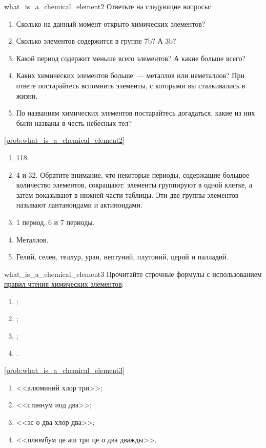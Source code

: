 \begin{problem}{}{what_is_a_chemical_element2}
    Ответьте на следующие вопросы:
    \begin{enumerate}[label=\arabic*)]
        \item Сколько на данный момент открыто химических элементов?
        \item Сколько элементов содержится в группе 7b? А 3b?
        \item Какой период содержит меньше всего элементов? А какие больше всего?
        \item Каких химических элементов больше~--- металлов или неметаллов? При ответе постарайтесь вспомнить элементы, с которыми вы сталкивались в жизни.
        \item По названиям химических элементов постарайтесь догадаться, какие из них были названы в честь небесных тел?
    \end{enumerate}

    \begin{sol}{\ref{prob:what_is_a_chemical_element2}}
        \begin{enumerate}[label=\arabic*)]
            \item 118.
            \item 4 и 32. Обратите внимание, что некоторые периоды, содержащие большое количество элементов, сокращают: элементы группируют в одной клетке, а затем показывают в нижней части таблицы. Эти две группы элементов называют лантаноидами и актиноидами.
            \item 1 период, 6 и 7 периоды.
            \item Металлов.
            \item Гелий, селен, теллур, уран, нептуний, плутоний, церий и палладий.
        \end{enumerate}
    \end{sol}
\end{problem}

\begin{problem}{}{what_is_a_chemical_element3}
    Прочитайте строчные формулы с использованием \hyperref[sec:reading_lowercase_formulas]{правил чтения химических элементов}:
    \begin{enumerate}
        \item {};
        \item {};
        \item {};
        \item {}.
    \end{enumerate}

    \begin{sol}{\ref{prob:what_is_a_chemical_element3}}
        \begin{enumerate}
        \item <<алюминий хлор три>>;
        \item <<станнум иод два>>;
        \item <<эс о два хлор два>>;
        \item <<плюмбум це аш три це о два дважды>>.
    \end{enumerate}
    \end{sol}
\end{problem}

